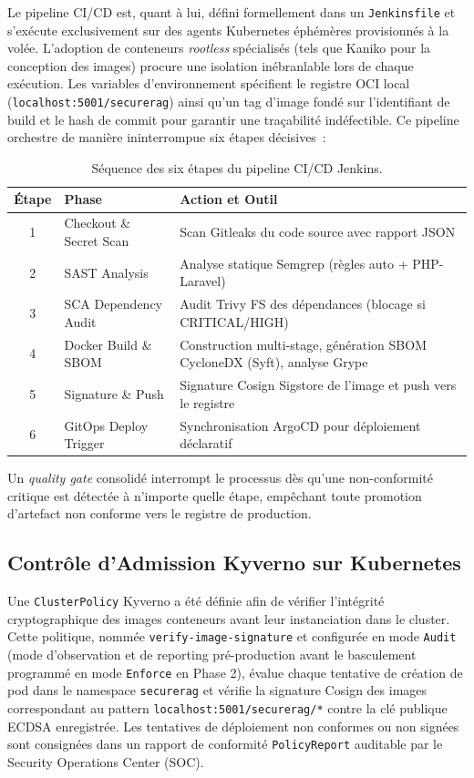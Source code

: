 Le pipeline CI/CD est, quant à lui, défini formellement dans un \texttt{Jenkinsfile} et s'exécute exclusivement sur des agents Kubernetes éphémères provisionnés à la volée. L'adoption de conteneurs \textit{rootless} spécialisés (tels que Kaniko pour la conception des images) procure une isolation inébranlable lors de chaque exécution. Les variables d'environnement spécifient le registre OCI local (\texttt{localhost:5001/securerag}) ainsi qu'un tag d'image fondé sur l'identifiant de build et le hash de commit pour garantir une traçabilité indéfectible. Ce pipeline orchestre de manière ininterrompue six étapes décisives~:

\begin{table}[htbp]
\centering
\scriptsize
\begin{tabular}{@{}clp{8cm}@{}}
\toprule
\textbf{Étape} & \textbf{Phase} & \textbf{Action et Outil} \\
\midrule
1 & Checkout \& Secret Scan & Scan Gitleaks du code source avec rapport JSON \\
2 & SAST Analysis & Analyse statique Semgrep (règles auto + PHP-Laravel) \\
3 & SCA Dependency Audit & Audit Trivy FS des dépendances (blocage si CRITICAL/HIGH) \\
4 & Docker Build \& SBOM & Construction multi-stage, génération SBOM CycloneDX (Syft), analyse Grype \\
5 & Signature \& Push & Signature Cosign Sigstore de l'image et push vers le registre \\
6 & GitOps Deploy Trigger & Synchronisation ArgoCD pour déploiement déclaratif \\
\bottomrule
\end{tabular}
\caption{Séquence des six étapes du pipeline CI/CD Jenkins.}
\label{tab:pipeline_stages}
\end{table}

Un \textit{quality gate} consolidé interrompt le processus dès qu'une non-conformité critique est détectée à n'importe quelle étape, empêchant toute promotion d'artefact non conforme vers le registre de production.

\subsection{Contrôle d'Admission Kyverno sur Kubernetes}

Une \texttt{ClusterPolicy} Kyverno a été définie afin de vérifier l'intégrité cryptographique des images conteneurs avant leur instanciation dans le cluster. Cette politique, nommée \texttt{verify-image-signature} et configurée en mode \texttt{Audit} (mode d'observation et de reporting pré-production avant le basculement programmé en mode \texttt{Enforce} en Phase 2), évalue chaque tentative de création de pod dans le namespace \texttt{securerag} et vérifie la signature Cosign des images correspondant au pattern \texttt{localhost:5001/securerag/*} contre la clé publique ECDSA enregistrée. Les tentatives de déploiement non conformes ou non signées sont consignées dans un rapport de conformité \texttt{PolicyReport} auditable par le Security Operations Center (SOC).

